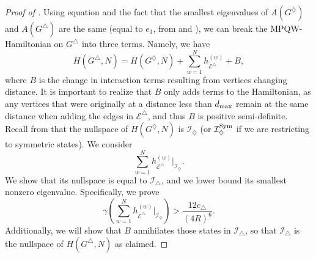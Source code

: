 \documentclass[../thesis-main/thesis-main]{subfiles}
\begin{document}
\begin{proof}[Proof of \protect{}]  Using equation  and the fact that the smallest eigenvalues of $A(G^{\diamondsuit})$ and $A(G^{\triangle})$ are the same (equal to $e_{1}$, from  and ), we can break the MPQW-Hamiltonian on $G^\triangle$ into three terms.  Namely, we have
\begin{equation}
  H(G^{\triangle},N)=H(G^{\diamondsuit},N)+\sum_{w=1}^{N}h_{\mathcal{E}^{\triangle}}^{(w)} + B,\label{eq:H_G^triangle,diamond}
\end{equation}
where $B$ is the change in interaction terms resulting from vertices changing distance.  It is important to realize that $B$ only adds terms to the Hamiltonian, as any vertices that were originally at a distance less than $d_{\text{max}}$ remain at the same distance when adding the edges in $\mathcal{E}^\triangle$, and thus $B$ is positive semi-definite.  Recall from  that the nullspace of $H(G^{\diamondsuit},N)$ is $\mathcal{I}_{\diamondsuit}$ (or $\mathcal{I}_\diamondsuit^{\operatorname{Sym}}$ if we are restricting to symmetric states). We consider 
\begin{equation}
  \sum_{w=1}^{N}h_{\mathcal{E}^{\triangle}}^{(w)}\bigg|_{\mathcal{I}_{\diamondsuit}}.\label{eq:restriction to script R}
\end{equation}
We show that its nullspace is equal to $\mathcal{I}_{\triangle}$, and we lower bound its smallest nonzero eigenvalue. Specifically, we prove
\begin{equation}
  \gamma\left(\sum_{w=1}^{N}h_{\mathcal{E}^{\triangle}}^{(w)}\bigg|_{\mathcal{I}_{\diamondsuit}}\right)>\frac{12c_{\triangle}}{(4R)^{6}}.\label{eq:bound_R6}
\end{equation}
Additionally, we will show that $B$ annihilates those states in $\mathcal{I}_{\triangle}$, so that $\mathcal{I}_{\triangle}$ is the nullspace of $H(G^{\triangle},N)$ as claimed.


\end{proof}
\end{document}
